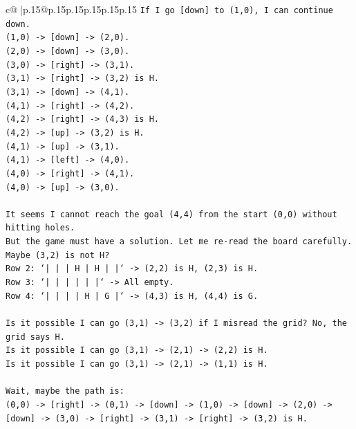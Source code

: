\documentclass{article}
\begin{document}
{\begin{supertabular}{c@{$\;$}|p{.15\linewidth}@{}p{.15\linewidth}p{.15\linewidth}p{.15\linewidth}p{.15\linewidth}p{.15\linewidth}}
{{{\texttt{If I go {[}down{]} to (1,0), I can continue down.} \\
\texttt{(1,0) {-}> {[}down{]} {-}> (2,0).} \\
\texttt{(2,0) {-}> {[}down{]} {-}> (3,0).} \\
\texttt{(3,0) {-}> {[}right{]} {-}> (3,1).} \\
\texttt{(3,1) {-}> {[}right{]} {-}> (3,2) is H.} \\
\texttt{(3,1) {-}> {[}down{]} {-}> (4,1).} \\
\texttt{(4,1) {-}> {[}right{]} {-}> (4,2).} \\
\texttt{(4,2) {-}> {[}right{]} {-}> (4,3) is H.} \\
\texttt{(4,2) {-}> {[}up{]} {-}> (3,2) is H.} \\
\texttt{(4,1) {-}> {[}up{]} {-}> (3,1).} \\
\texttt{(4,1) {-}> {[}left{]} {-}> (4,0).} \\
\texttt{(4,0) {-}> {[}right{]} {-}> (4,1).} \\
\texttt{(4,0) {-}> {[}up{]} {-}> (3,0).} \\
\\ 
\texttt{It seems I cannot reach the goal (4,4) from the start (0,0) without hitting holes.} \\
\texttt{But the game must have a solution. Let me re{-}read the board carefully.} \\
\texttt{Maybe (3,2) is not H?} \\
\texttt{Row 2: `|     |     |  H  |  H  |     |` {-}> (2,2) is H, (2,3) is H.} \\
\texttt{Row 3: `|     |     |     |     |     |` {-}> All empty.} \\
\texttt{Row 4: `|     |     |     |  H  |  G  |` {-}> (4,3) is H, (4,4) is G.} \\
\\ 
\texttt{Is it possible I can go (3,1) {-}> (3,2) if I misread the grid? No, the grid says H.} \\
\texttt{Is it possible I can go (3,1) {-}> (2,1) {-}> (2,2) is H.} \\
\texttt{Is it possible I can go (3,1) {-}> (2,1) {-}> (1,1) is H.} \\
\\ 
\texttt{Wait, maybe the path is:} \\
\texttt{(0,0) {-}> {[}right{]} {-}> (0,1) {-}> {[}down{]} {-}> (1,0) {-}> {[}down{]} {-}> (2,0) {-}> {[}down{]} {-}> (3,0) {-}> {[}right{]} {-}> (3,1) {-}> {[}right{]} {-}> (3,2) is H.} \\
}}}
\end{supertabular}}
\end{document}
